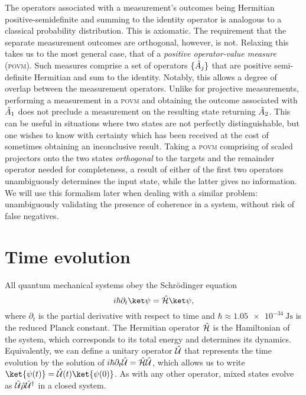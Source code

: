 The operators associated with a measurement's outcomes being Hermitian positive-semidefinite and summing to the identity operator is analogous to a classical probability distribution.
This is axiomatic.
The requirement that the separate measurement outcomes are orthogonal, however, is not.
Relaxing this takes us to the most general case, that of a \emph{positive operator-value measure} (\textsc{povm}).
Such measures comprise a set of operators $\{\hat{A}_j\}$ that are positive semi-definite Hermitian and sum to the identity.
Notably, this allows a degree of overlap between the measurement operators.
Unlike for projective measurements, performing a measurement in a \textsc{povm} and obtaining the outcome associated with $\hat{A}_1$ does not preclude a measurement on the resulting state returning $\hat{A}_2$.
This can be useful in situations where two states are not perfectly distinguishable, but one wishes to know with certainty which has been received at the cost of sometimes obtaining an inconclusive result.
Taking a \textsc{povm} comprising of scaled projectors onto the two states \emph{orthogonal} to the targets and the remainder operator needed for completeness, a result of either of the first two operators unambiguously determines the input state, while the latter gives no information.
We will use this formalism later when dealing with a similar problem: unambiguously validating the presence of coherence in a system, without risk of false negatives.


\section{Time evolution}

All quantum mechanical systems obey the Schr\"odinger equation
\begin{equation}\label{eq:qi-time-evolution-commuting-hamiltonian}
i\hbar\partial_t\ket\psi = \H\ket\psi,
\end{equation}
where $\partial_t$ is the partial derivative with respect to time and $\hbar \approx \qty{1.05e-34}{\J\s}$ is the reduced Planck constant.
The Hermitian operator $\hat{\mathcal H}$ is the Hamiltonian of the system, which corresponds to its total energy and determines its dynamics.
Equivalently, we can define a unitary operator $\hat{\mathcal U}$ that represents the time evolution by the solution of $i\hbar\partial_t\hat{\mathcal U} = \hat{\mathcal H}\hat{\mathcal U}$, which allows us to write $\ket{\psi(t)} = \U(t)\ket{\psi(0)}$.
As with any other operator, mixed states evolve as $\hat{\mathcal U}\hat{\rho}\hat{\mathcal U}^\dagger$ in a closed system.

